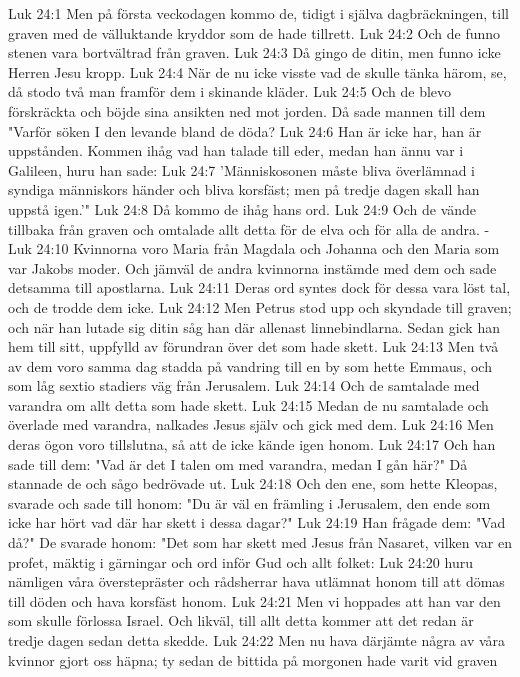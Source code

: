 Luk 24:1  Men på första veckodagen kommo de, tidigt i själva dagbräckningen, till graven med de välluktande kryddor som de hade tillrett.
Luk 24:2  Och de funno stenen vara bortvältrad från graven.
Luk 24:3  Då gingo de ditin, men funno icke Herren Jesu kropp.
Luk 24:4  När de nu icke visste vad de skulle tänka härom, se, då stodo två man framför dem i skinande kläder.
Luk 24:5  Och de blevo förskräckta och böjde sina ansikten ned mot jorden. Då sade mannen till dem "Varför söken I den levande bland de döda?
Luk 24:6  Han är icke har, han är uppstånden. Kommen ihåg vad han talade till eder, medan han ännu var i Galileen, huru han sade:
Luk 24:7  'Människosonen måste bliva överlämnad i syndiga människors händer och bliva korsfäst; men på tredje dagen skall han uppstå igen.'"
Luk 24:8  Då kommo de ihåg hans ord.
Luk 24:9  Och de vände tillbaka från graven och omtalade allt detta för de elva och för alla de andra. -
Luk 24:10  Kvinnorna voro Maria från Magdala och Johanna och den Maria som var Jakobs moder. Och jämväl de andra kvinnorna instämde med dem och sade detsamma till apostlarna.
Luk 24:11  Deras ord syntes dock för dessa vara löst tal, och de trodde dem icke.
Luk 24:12  Men Petrus stod upp och skyndade till graven; och när han lutade sig ditin såg han där allenast linnebindlarna. Sedan gick han hem till sitt, uppfylld av förundran över det som hade skett.
Luk 24:13  Men två av dem voro samma dag stadda på vandring till en by som hette Emmaus, och som låg sextio stadiers väg från Jerusalem.
Luk 24:14  Och de samtalade med varandra om allt detta som hade skett.
Luk 24:15  Medan de nu samtalade och överlade med varandra, nalkades Jesus själv och gick med dem.
Luk 24:16  Men deras ögon voro tillslutna, så att de icke kände igen honom.
Luk 24:17  Och han sade till dem: "Vad är det I talen om med varandra, medan I gån här?" Då stannade de och sågo bedrövade ut.
Luk 24:18  Och den ene, som hette Kleopas, svarade och sade till honom: "Du är väl en främling i Jerusalem, den ende som icke har hört vad där har skett i dessa dagar?"
Luk 24:19  Han frågade dem: "Vad då?" De svarade honom: "Det som har skett med Jesus från Nasaret, vilken var en profet, mäktig i gärningar och ord inför Gud och allt folket:
Luk 24:20  huru nämligen våra överstepräster och rådsherrar hava utlämnat honom till att dömas till döden och hava korsfäst honom.
Luk 24:21  Men vi hoppades att han var den som skulle förlossa Israel. Och likväl, till allt detta kommer att det redan är tredje dagen sedan detta skedde.
Luk 24:22  Men nu hava därjämte några av våra kvinnor gjort oss häpna; ty sedan de bittida på morgonen hade varit vid graven

